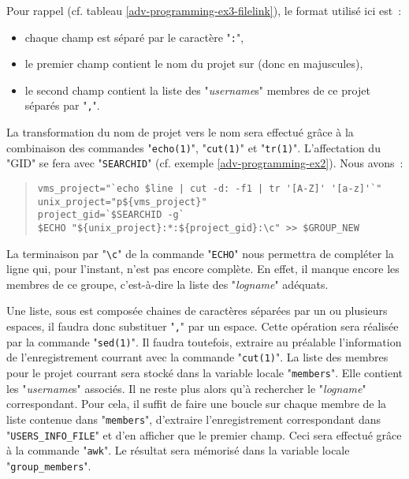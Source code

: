 Pour rappel (cf. tableau \ref{adv-programming-ex3-filelink}), le format utilis{\'e} ici
est~:
\begin{itemize}
	\item	chaque champ est s{\'e}par{\'e} par le caract{\`e}re "{\tt :}",
	\item	le premier champ contient le nom du projet sur {\OpenVMS} (donc en
			majuscules),
	\item	le second champ contient la liste des "{\sl username}s" {\OpenVMS}
			membres de ce projet s{\'e}par{\'e}s par "{\tt ,}".
\end{itemize}
La transformation du nom de projet {\OpenVMS} vers le nom {\Unix} sera effectu{\'e}
gr{\^a}ce {\`a} la combinaison des commandes "{\tt echo(1)}", "{\tt cut(1)}" et
"{\tt tr(1)}". L'affectation du "GID" se fera avec "{\tt SEARCHID}"
(cf. exemple \ref{adv-programming-ex2}). Nous avons~:
\begin{quote}
\begin{verbatim}
vms_project="`echo $line | cut -d: -f1 | tr '[A-Z]' '[a-z]'`"
unix_project="p${vms_project}"
project_gid=`$SEARCHID -g`
$ECHO "${unix_project}:*:${project_gid}:\c" >> $GROUP_NEW
\end{verbatim}
\end{quote}

\begin{remarque}
La terminaison par "\verb=\c=" de la commande "{\tt ECHO}" nous permettra
de compl{\'e}ter la ligne qui, pour l'instant, n'est pas encore compl{\`e}te. En effet, il
manque encore les membres de ce groupe, c'est-{\`a}-dire la liste des "{\sl logname}"
{\Unix} ad{\'e}quats.
\end{remarque}

Une liste, sous {\Unix} est compos{\'e}e chaines de caract{\`e}res s{\'e}par{\'e}es par
un ou plusieurs espaces, il faudra donc substituer "{\tt ,}" par un
espace. Cette op{\'e}ration sera r{\'e}alis{\'e}e par la commande 
"{\tt sed(1)}". Il faudra toutefois, extraire au pr{\'e}alable l'information de
l'enregistrement courrant avec la commande "{\tt cut(1)}". La liste
des membres pour le projet courrant sera stock{\'e} dans la variable locale
"{\tt members}". Elle contient les "{\sl username}s" {\OpenVMS}
associ{\'e}s. Il ne reste plus alors qu'{\`a} rechercher le "{\sl logname}"
{\Unix} correspondant. Pour cela, il suffit de faire une boucle sur
chaque membre de la liste contenue dans "{\tt members}", d'extraire
l'enregistrement correspondant dans "{\tt USERS\_INFO\_FILE}" et
d'en afficher que le premier champ. Ceci sera effectu{\'e} gr{\^a}ce {\`a} la commande
"{\tt awk}". Le r{\'e}sultat sera m{\'e}moris{\'e} dans la variable locale
"{\tt group\_members}".

